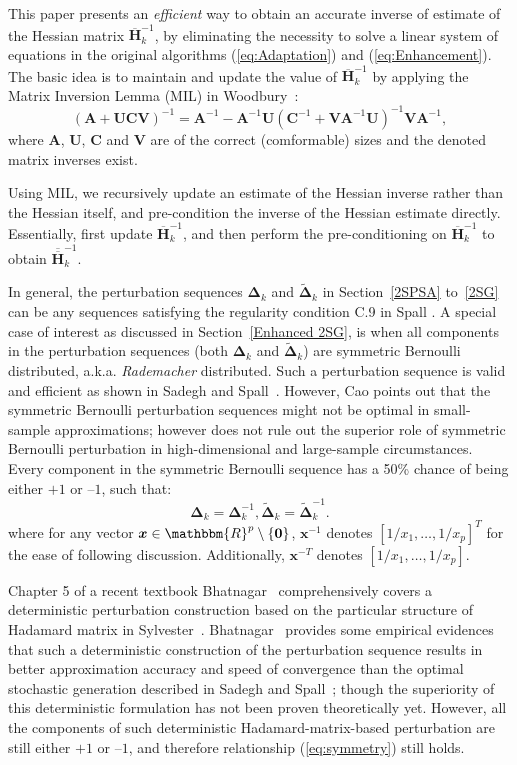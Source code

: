 \documentclass[conference,10.3cpt]{IEEEtran}
\newcommand{\bDelta}{\bm{\Delta}}
\newcommand{\oH}{\bm{\overline{H}}}
\newcommand{\ooH}{\bm{\overline{\overline{H}}}}
\newcommand{\tDelta}{\bm{\tilde{\Delta}}}
\begin{document}
This paper presents an \textit{efficient} way to obtain an accurate inverse of
estimate of the Hessian matrix $\oH_k^{-1}$, by eliminating the necessity to solve a
linear system of equations in the original algorithms (\ref{eq:Adaptation}) and (\ref{eq:Enhancement}). The basic idea is to maintain and update the
value of $\oH_k^{-1}$ by applying the Matrix Inversion Lemma (MIL) in Woodbury~\cite{Woodbury1950}:
\begin{equation}
\label{eq:MatrixInversion}
(\bm{A}+\bm{UCV})^{-1}=\bm{A}^{-1}-\bm{A}^{-1}\bm{U}(\bm{C}^{-1}+\bm{V}\bm{A}^{-1}\bm{U})^{-1}\bm{V}\bm{A}^{-1},
\end{equation}
where $\bm{A}$, $\bm{U}$, $\bm{C}$ and $\bm{V}$
are of the correct (comformable) sizes and the denoted matrix inverses
exist.

Using MIL, we recursively update an estimate of the
Hessian inverse rather than the Hessian itself, and
pre-condition the inverse of the Hessian estimate directly. Essentially, first update $ \oH_k^{-1} $, and then
perform the pre-conditioning on $ \oH_k^{-1} $ to obtain $\ooH_k^{-1}$.

In general, the perturbation sequences $\bDelta_k$ and
$\tDelta_k$ in Section~\ref{2SPSA} to~\ref{2SG} can be any sequences
satisfying the regularity condition C.9 in Spall
\cite{Spall2009}. A special case of interest as discussed in
Section~\ref{Enhanced 2SG}, is when
all components in the perturbation sequences (both $ \bDelta_k $ and
$\tDelta_k $) are symmetric Bernoulli distributed,
a.k.a. \textit{Rademacher} distributed. Such a perturbation sequence
is valid and efficient as shown in Sadegh and Spall~\cite{Sadegh1998}. However, Cao \cite{Cao2011} points out that the symmetric Bernoulli perturbation sequences might not be optimal in small-sample approximations; however \cite{Cao2011} does not rule out the superior role of symmetric Bernoulli perturbation in high-dimensional and large-sample circumstances. Every component in the symmetric Bernoulli sequence has a 50\% chance of being either $+1$ or
$\text{--}1$, such that:
\begin{equation} \label{eq:symmetry}
\bDelta_k=\bDelta_k^{-1}, \tDelta_k=\tDelta_k^{-1}.
\end{equation}
where for any vector
$ \bm{x}\in \mathbbm{R}^p \setminus \{\bm{0}\} $, 
$\bm{x}^{-1}$ denotes $[1/x_1, \ldots, 1/x_p]^T$ for the ease of following discussion. Additionally, $ \bm{x}^{-T} $ denotes $[1/x_1, \ldots, 1/x_p]$.

Chapter 5 of a recent textbook Bhatnagar~\cite{Bhatnagar2012} comprehensively covers a deterministic perturbation construction based on the particular structure of Hadamard matrix in Sylvester~\cite{Sylvester1867}. Bhatnagar~\cite{Bhatnagar2003} provides some empirical evidences that such a deterministic construction of the
perturbation sequence results in better approximation
accuracy and speed of convergence than the optimal stochastic
generation described in Sadegh and Spall~\cite{Sadegh1998}; though
the superiority of this deterministic formulation has not been proven theoretically yet. However, all the components of
such deterministic
Hadamard-matrix-based perturbation are still either $+1$ or $\text{--}1$,
and therefore relationship (\ref{eq:symmetry}) still holds.
\end{document}
